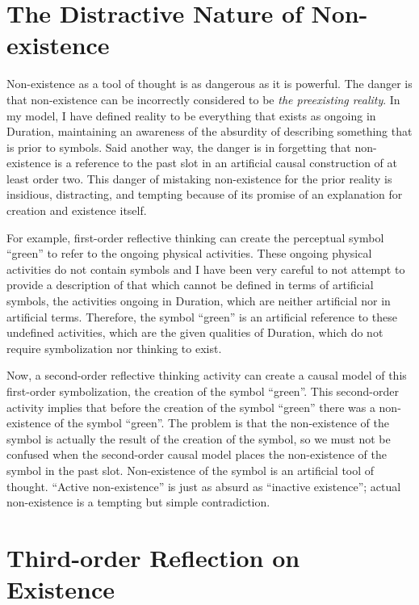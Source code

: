 \section{The Distractive Nature of Non-existence}

Non-existence as a tool of thought is as dangerous as it is powerful.
The danger is that non-existence can be incorrectly considered to be
\emph{the preexisting reality}.  In my model, I have defined reality
to be everything that exists as ongoing in Duration, maintaining an
awareness of the absurdity of describing something that is prior to
symbols.  Said another way, the danger is in forgetting that
non-existence is a reference to the past slot in an artificial causal
construction of at least order two.  This danger of mistaking
non-existence for the prior reality is insidious, distracting, and
tempting because of its promise of an explanation for creation and
existence itself.

For example, first-order reflective thinking can create the perceptual
symbol ``green'' to refer to the ongoing physical activities.  These
ongoing physical activities do not contain symbols and I have been
very careful to not attempt to provide a description of that which
cannot be defined in terms of artificial symbols, the activities
ongoing in Duration, which are neither artificial nor in artificial
terms.  Therefore, the symbol ``green'' is an artificial reference to
these undefined activities, which are the given qualities of Duration,
which do not require symbolization nor thinking to exist.

Now, a second-order reflective thinking activity can create a causal
model of this first-order symbolization, the creation of the symbol
``green''.  This second-order activity implies that before the
creation of the symbol ``green'' there was a non-existence of the
symbol ``green''.  The problem is that the non-existence of the symbol
is actually the result of the creation of the symbol, so we must not
be confused when the second-order causal model places the
non-existence of the symbol in the past slot.  Non-existence of the
symbol is an artificial tool of thought.  ``Active non-existence'' is
just as absurd as ``inactive existence''; actual non-existence is a
tempting but simple contradiction.

\section{Third-order Reflection on Existence}

